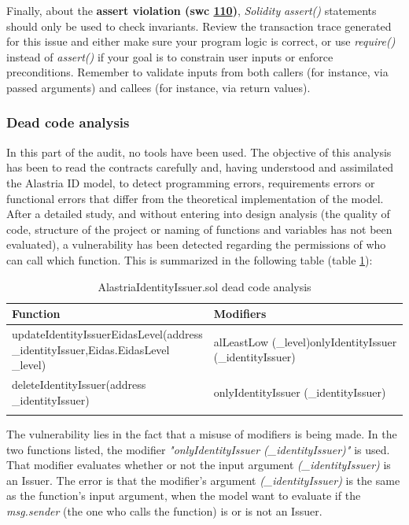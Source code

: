 Finally, about the \textbf{assert violation (\acrshort{swc} \href{https://swcregistry.io/docs/SWC-110}{110})}, \textit{Solidity} \textit{assert()} statements should only be used to check invariants. Review the transaction trace generated for this issue and either make sure your program logic is correct, or use \textit{require()} instead of \textit{assert()} if your goal is to constrain user inputs or enforce preconditions. Remember to validate inputs from both callers (for instance, via passed arguments) and callees (for instance, via return values).


\subsubsection{Dead code analysis}
In this part of the audit, no tools have been used. The objective of this analysis has been to read the contracts carefully and, having understood and assimilated the Alastria ID model, to detect programming errors, requirements errors or functional errors that differ from the theoretical implementation of the model.\\

After a detailed study, and without entering into design analysis (the quality of code, structure of the project or naming of functions and variables has not been evaluated), a vulnerability has been detected regarding the permissions of who can call which function. This is summarized in the following table (table \ref{tab:dead-code-issuer}):
\newpage
\begin{longtable}{||p{0.5\linewidth} | p{0.5\linewidth}||}
    \hline
    \textbf{Function}                                                                                   & \textbf{Modifiers}                                                 \\ [0.5ex]
    \hline\hline
    updateIdentityIssuerEidasLevel\newline (address \_identityIssuer,\newline Eidas.EidasLevel \_level) & alLeastLow (\_level)\newline onlyIdentityIssuer (\_identityIssuer) \\
    \hline
    deleteIdentityIssuer\newline (address \_identityIssuer)                                             & onlyIdentityIssuer (\_identityIssuer)                              \\[1ex]
    \hline
    \caption{AlastriaIdentityIssuer.sol dead code analysis}
    \label{tab:dead-code-issuer}
\end{longtable}
The vulnerability lies in the fact that a misuse of modifiers is being made.  In the two functions listed, the modifier \textit{"onlyIdentityIssuer (\_identityIssuer)"} is used. That modifier evaluates whether or not the input argument \textit{(\_identityIssuer)} is an Issuer. The error is that the modifier's argument \textit{(\_identityIssuer)} is the same as the function's input argument, when the model want to evaluate if the \textit{msg.sender} (the one who calls the function) is or is not an Issuer.\\

